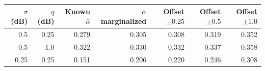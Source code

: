 \begin{tabular}{rrrrrrr}
\toprule
$\sigma$ (dB) & $q$ (dB) & Known $\bar\alpha$ & $\alpha$ marginalized & Offset $\pm0.25$ & Offset $\pm0.5$ & Offset $\pm1.0$ \\
\midrule
0.5 & 0.25 & 0.279 & 0.305 & 0.308 & 0.319 & 0.352 \\
0.5 & 1.0 & 0.322 & 0.330 & 0.332 & 0.337 & 0.358 \\
0.25 & 0.25 & 0.151 & 0.206 & 0.220 & 0.246 & 0.308 \\
\bottomrule
\end{tabular}